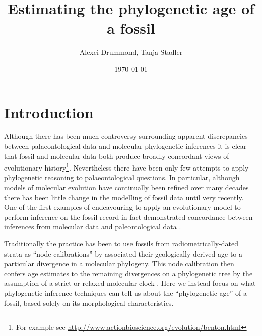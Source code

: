 \documentclass[11pt]{article}
\begin{document}
\title{Estimating the phylogenetic age of a fossil}
\author{Alexei Drummond, Tanja Stadler}
\date{\today{}}
\maketitle

\section*{Introduction}


Although there has been much controversy surrounding apparent discrepancies between palaeontological data and molecular phylogenetic inferences it is clear that fossil and molecular data both produce broadly concordant views of evolutionary history\footnote{For example see \url{http://www.actionbioscience.org/evolution/benton.html}}. Nevertheless there have been only few attempts to apply phylogenetic reasoning to palaeontological questions. In particular, although models of molecular evolution have continually been refined over many decades there has been little change in the modelling of fossil data until very recently. One of the first examples of endeavouring to apply an evolutionary model to perform inference on the fossil record in fact demonstrated concordance between inferences from  molecular data and paleontological data \autocite{tavare2002using}. 

Traditionally the practice has been to use fossils from radiometrically-dated strata as ``node calibrations'' by associated their geologically-derived age to a particular divergence in a molecular phylogeny. This node calibration then confers age estimates to the remaining divergences on a phylogenetic tree by the assumption of a strict or relaxed molecular clock \autocite{Thorne1998,thorne2005,yang2006,Drummond2006}. 
Here we instead focus on what phylogenetic inference techniques can tell us about the ``phylogenetic age'' of a fossil, based solely on its morphological characteristics.
\end{document}
